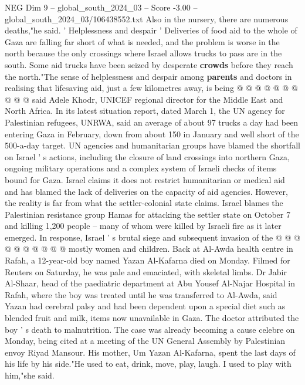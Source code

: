 \begin{textsample}{NEG Dim 9 – global\_south\_2024\_03 – Score -3.00 – global\_south\_2024\_03/106438552.txt}
Also in the nursery, there are numerous deaths,"he said. ' Helplessness and despair ' Deliveries of food aid to the whole of Gaza are falling far short of what is needed, and the problem is worse in the north because the only crossings where Israel allows trucks to pass are in the south.
Some aid trucks have been seized by desperate \textbf{crowds} before they reach the north."The sense of helplessness and despair among \textbf{parents} and doctors in realising that lifesaving aid, just a few kilometres away, is being @ @ @ @ @ @ @ @ @ @ said Adele Khodr, UNICEF regional director for the Middle East and North Africa.
In its latest situation report, dated March 1, the UN agency for Palestinian refugees, UNRWA, said an average of about 97 trucks a day had been entering Gaza in February, down from about 150 in January and well short of the 500-a-day target.
UN agencies and humanitarian groups have blamed the shortfall on Israel ' s actions, including the closure of land crossings into northern Gaza, ongoing military operations and a complex system of Israeli checks of items bound for Gaza.
Israel claims it does not restrict humanitarian or medical aid and has blamed the lack of deliveries on the capacity of aid agencies.
However, the reality is far from what the settler-colonial state claims.
Israel blames the Palestinian resistance group Hamas for attacking the settler state on October 7 and killing 1,200 people -- many of whom were killed by Israeli fire as it later emerged.
In response, Israel ' s brutal siege and subsequent invasion of the @ @ @ @ @ @ @ @ @ @ mostly women and children.
Back at Al-Awda health centre in Rafah, a 12-year-old boy named Yazan Al-Kafarna died on Monday.
Filmed for Reuters on Saturday, he was pale and emaciated, with skeletal limbs.
Dr Jabir Al-Shaar, head of the paediatric department at Abu Yousef Al-Najar Hospital in Rafah, where the boy was treated until he was transferred to Al-Awda, said Yazan had cerebral palsy and had been dependent upon a special diet such as blended fruit and milk, items now unavailable in Gaza.
The doctor attributed the boy ' s death to malnutrition.
The case was already becoming a cause celebre on Monday, being cited at a meeting of the UN General Assembly by Palestinian envoy Riyad Mansour.
His mother, Um Yazan Al-Kafarna, spent the last days of his life by his side."He used to eat, drink, move, play, laugh.
I used to play with him,"she said.

\end{textsample}
